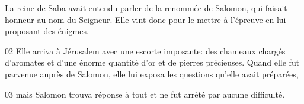 La reine de Saba avait entendu parler de la renommée de Salomon, qui faisait honneur au nom du Seigneur. Elle vint donc pour le mettre à l’épreuve en lui proposant des énigmes.

02 Elle arriva à Jérusalem avec une escorte imposante: des chameaux chargés d’aromates et d’une énorme quantité d’or et de pierres précieuses. Quand elle fut parvenue auprès de Salomon, elle lui exposa les questions qu’elle avait préparées,

03 mais Salomon trouva réponse à tout et ne fut arrêté par aucune difficulté.
